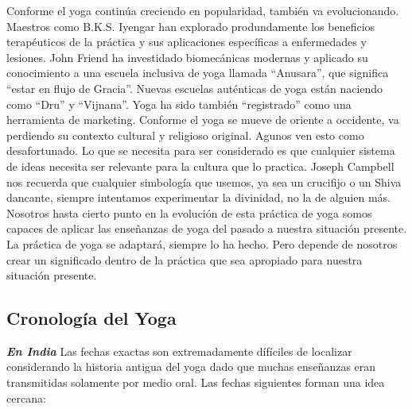 Conforme el yoga continúa creciendo en popularidad, tambi\'en va evolucionando. Maestros como B.K.S. Iyengar han explorado produndamente los beneficios terap\'euticos de la práctica y sus aplicaciones específicas a enfermedades y lesiones. John Friend ha investidado biomecánicas modernas y aplicado su conocimiento a una escuela inclusiva de yoga llamada ``Anusara'', que significa ``estar en flujo de Gracia''. Nuevas escuelas aut\'enticas de yoga están naciendo como ``Dru'' y ``Vijnana''. Yoga ha sido tambi\'en ``registrado'' como una herramienta de marketing. Conforme el yoga se mueve de oriente a occidente, va perdiendo su contexto cultural y religioso original. Agunos ven esto como desafortunado. Lo que se necesita para ser considerado es que cualquier sistema de ideas necesita ser relevante para la cultura que lo practica. Joseph Campbell nos recuerda que cualquier simbología que usemos, ya sea un crucifijo o un Shiva dancante, siempre intentamos experimentar la divinidad, no la de alguien más. Nosotros hasta cierto punto en la evolución de esta práctica de yoga somos capaces de aplicar las enseñanzas de yoga del pasado a nuestra situación presente. La práctica de yoga se adaptará, siempre lo ha hecho. Pero depende de nosotros crear un significado dentro de la práctica que sea apropiado para nuestra situación presente.

\subsection{Cronología del Yoga}

\textit{\textbf{En India}}
Las fechas exactas son extremadamente dífíciles de localizar considerando la historia antigua del yoga dado que muchas enseñanzas eran transmitidas solamente por medio oral. Las fechas siguientes forman una idea cercana:

